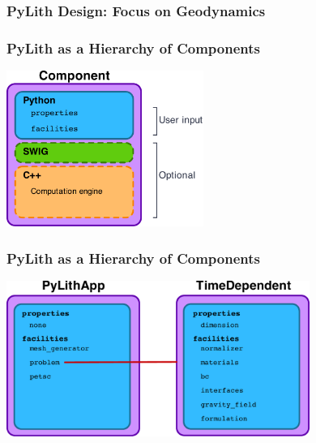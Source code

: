 \documentclass{beamer}
\begin{document}
\begin{frame}
  \frametitle{PyLith Design: Focus on Geodynamics}

  

\end{frame}


\begin{frame}
  \frametitle{PyLith as a Hierarchy of Components}

  \vfill
  \begin{center}
    \includegraphics[height=2.0in]{figs/component}
  \end{center}  
  \vfill

\end{frame}


\begin{frame}
  \frametitle{PyLith as a Hierarchy of Components}

  \vfill
  \begin{center}
    \includegraphics[height=2.0in]{figs/pylithapp}
  \end{center}  
  \vfill

\end{frame}
\end{document}
